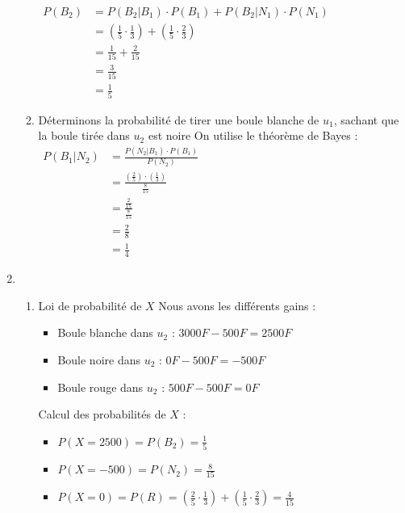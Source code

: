 \documentclass[12pt,a4paper]{article}
\begin{document}
\begin{enumerate}
\begin{enumerate}
    \(
    \begin{aligned}
        P(B_2) &= P(B_2 | B_1) \cdot P(B_1) + P(B_2 | N_1) \cdot P(N_1)\\
               &= \left( \frac{1}{5} \cdot \frac{1}{3} \right) + \left( \frac{1}{5} \cdot \frac{2}{3} \right)\\
               &= \frac{1}{15} + \frac{2}{15}  \\
               &= \frac{3}{15}\\
               &= \frac{1}{5}
    \end{aligned}
    \)
    \item Déterminons la probabilité de tirer une boule blanche de $u_{1}$, sachant que la boule tirée dans $u_{2}$ est noire
On utilise le théorème de Bayes :\\
 \(
    \begin{aligned}
        P(B_1 | N_2) &= \frac{P(N_2 | B_1) \cdot P(B_1)}{P(N_2)}\\
                    &=  \frac{\left( \frac{2}{5} \right) \cdot \left( \frac{1}{3} \right)}{\frac{8}{15}}\\
                    &= \frac{\frac{2}{15}}{\frac{8}{15}}  \\
                    &= \frac{2}{8}\\
                    &= \frac{1}{4}
    \end{aligned}
    \)
\end{enumerate}
\item 
\begin{enumerate}
    \item Loi de probabilité de $X$ Nous avons les différents gains :
\begin{itemize}
    \item Boule blanche dans $u_{2}$ : $3000F - 500F = 2500F$
    \item Boule noire dans $u_{2}$ : $0F - 500F = -500F$
    \item Boule rouge dans $u_{2}$ : $500F - 500F = 0F$
\end{itemize}

Calcul des probabilités de $X$ :
\begin{itemize}
    \item $P(X = 2500) = P(B_{2}) = \frac{1}{5}$
    \item $P(X = -500) = P(N_{2}) = \frac{8}{15}$
    \item $P(X = 0) = P(R) = \left( \frac{2}{5} \cdot \frac{1}{3} \right) + \left( \frac{1}{5} \cdot \frac{2}{3} \right) = \frac{4}{15}$
\end{itemize}    


\end{enumerate}
\end{enumerate}
\end{document}
